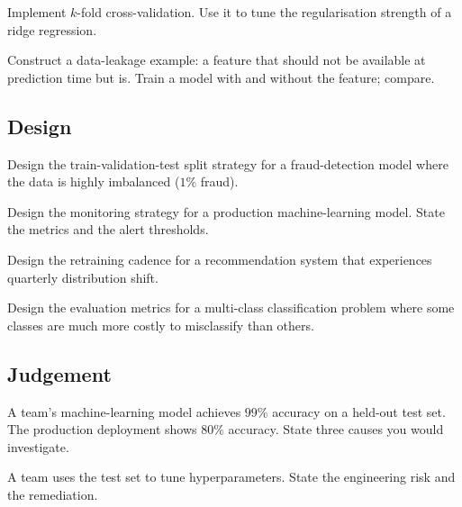 \begin{exercise}
Implement $k$-fold cross-validation. Use it to tune the regularisation strength of a ridge regression.
\end{exercise}

\begin{exercise}
Construct a data-leakage example: a feature that should not be available at prediction time but is. Train a model with and without the feature; compare.
\end{exercise}

\subsection*{Design}

\begin{exercise}
Design the train-validation-test split strategy for a fraud-detection model where the data is highly imbalanced ($1\%$ fraud).
\end{exercise}

\begin{exercise}
Design the monitoring strategy for a production machine-learning model. State the metrics and the alert thresholds.
\end{exercise}

\begin{exercise}
Design the retraining cadence for a recommendation system that experiences quarterly distribution shift.
\end{exercise}

\begin{exercise}
Design the evaluation metrics for a multi-class classification problem where some classes are much more costly to misclassify than others.
\end{exercise}

\subsection*{Judgement}

\begin{exercise}
A team's machine-learning model achieves $99\%$ accuracy on a held-out test set. The production deployment shows $80\%$ accuracy. State three causes you would investigate.
\end{exercise}

\begin{exercise}
A team uses the test set to tune hyperparameters. State the engineering risk and the remediation.
\end{exercise}

